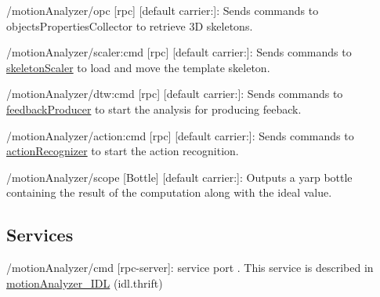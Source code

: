 \begin{DoxyItemize}
\item /motion\+Analyzer/opc \mbox{[}rpc\mbox{]} \mbox{[}default carrier\+:\mbox{]}\+: Sends commands to objects\+Properties\+Collector to retrieve 3D skeletons.
\item /motion\+Analyzer/scaler\+:cmd \mbox{[}rpc\mbox{]} \mbox{[}default carrier\+:\mbox{]}\+: Sends commands to \mbox{\hyperlink{group__skeletonScaler}{skeleton\+Scaler}} to load and move the template skeleton.
\item /motion\+Analyzer/dtw\+:cmd \mbox{[}rpc\mbox{]} \mbox{[}default carrier\+:\mbox{]}\+: Sends commands to \mbox{\hyperlink{group__feedbackProducer}{feedback\+Producer}} to start the analysis for producing feeback.
\item /motion\+Analyzer/action\+:cmd \mbox{[}rpc\mbox{]} \mbox{[}default carrier\+:\mbox{]}\+: Sends commands to \mbox{\hyperlink{group__actionRecognizer}{action\+Recognizer}} to start the action recognition.
\item /motion\+Analyzer/scope \mbox{[}Bottle\mbox{]} \mbox{[}default carrier\+:\mbox{]}\+: Outputs a yarp bottle containing the result of the computation along with the ideal value.
\end{DoxyItemize}\hypertarget{group__skeletonViewer_services_sec}{}\subsection{Services}\label{group__skeletonViewer_services_sec}

\begin{DoxyItemize}
\item /motion\+Analyzer/cmd \mbox{[}rpc-\/server\mbox{]}\+: service port . This service is described in \mbox{\hyperlink{classmotionAnalyzer__IDL}{motion\+Analyzer\+\_\+\+I\+DL}} (idl.\+thrift) 
\end{DoxyItemize}